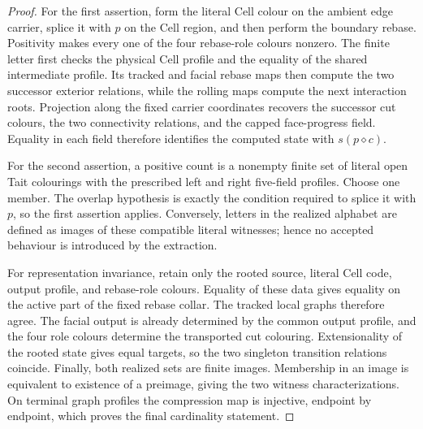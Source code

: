 
\begin{proof}
For the first assertion, form the literal Cell colour on the ambient edge
carrier, splice it with $p$ on the Cell region, and then perform the boundary
rebase.  Positivity makes every one of the four rebase-role colours nonzero.
The finite letter first checks the physical Cell profile and the equality of
the shared intermediate profile.  Its tracked and facial rebase maps then
compute the two successor exterior relations, while the rolling maps compute
the next interaction roots.  Projection along the fixed carrier coordinates
recovers the successor cut colours, the two connectivity relations, and the
capped face-progress field.  Equality in each field therefore identifies the
computed state with $s(p\diamond c)$.

For the second assertion, a positive count is a nonempty finite set of literal
open Tait colourings with the prescribed left and right five-field profiles.
Choose one member.  The overlap hypothesis is exactly the condition required
to splice it with $p$, so the first assertion applies.  Conversely, letters in
the realized alphabet are defined as images of these compatible literal
witnesses; hence no accepted behaviour is introduced by the extraction.

For representation invariance, retain only the rooted source, literal Cell
code, output profile, and rebase-role colours.  Equality of these data gives
equality on the active part of the fixed rebase collar.  The tracked local
graphs therefore agree.  The facial output is already determined by the
common output profile, and the four role colours determine the transported
cut colouring.  Extensionality of the rooted state gives equal targets, so
the two singleton transition relations coincide.  Finally, both realized
sets are finite images.  Membership in an image is equivalent to existence
of a preimage, giving the two witness characterizations.  On terminal graph
profiles the compression map is injective, endpoint by endpoint, which proves
the final cardinality statement.
\end{proof}

